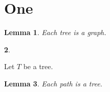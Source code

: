 \documentclass{article}
\newtheorem{lem}{Lemma}[section]
\newtheorem{sta}[lem]{}
\def\lbl#1{\label{#1}}
\def\lemm#1{ \begin{lem} \lbl{#1} }
\def\st { \begin{sta} \ \end{sta}}
\begin{document}
\section{One}
\lemm{a} Each tree is a graph. \end{lem}
\st Let $T$ be a tree.
\begin{lem} Each path is a tree. \end{lem}
\end{document}
